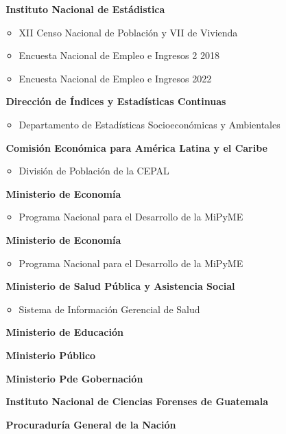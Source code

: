 \newpage
	\begin{itemize}
		\item[$ $] \textbf{Instituto Nacional de Estádistica}
		\begin{itemize}
			\item	XII Censo Nacional de Población y VII de Vivienda 
			\item	Encuesta Nacional de Empleo e Ingresos 2 2018
			\item	Encuesta Nacional de Empleo e Ingresos 2022
		\end{itemize}
		\item[$ $] \textbf{Dirección de Índices y Estadísticas Continuas}
		\begin{itemize}
			\item	Departamento de Estadísticas Socioeconómicas y Ambientales
		\end{itemize}
		\item[$ $] \textbf{Comisión Económica para América Latina y el Caribe}
		\begin{itemize}
			\item	División de Población de la CEPAL
		\end{itemize}
		\item[$ $] \textbf{Ministerio de Economía}
		\begin{itemize}
			\item	Programa Nacional para el Desarrollo de la MiPyME
		\end{itemize}
		\item[$ $] \textbf{Ministerio de Economía}
		\begin{itemize}
			\item	Programa Nacional para el Desarrollo de la MiPyME
		\end{itemize}	
		\item[$ $] \textbf{Ministerio de Salud Pública y Asistencia Social}
		\begin{itemize}
			\item	Sistema de Información Gerencial de Salud		
		\end{itemize}
		\item[$ $] \textbf{Ministerio de Educación}
		\item[$ $] \textbf{Ministerio Público}
		\item[$ $] \textbf{Ministerio Pde Gobernación}
		\item[$ $] \textbf{Instituto Nacional de Ciencias Forenses de Guatemala}	
		\item[$ $] \textbf{Procuraduría General de la Nación}
		\begin{itemize}

\end{itemize}
\end{itemize}
